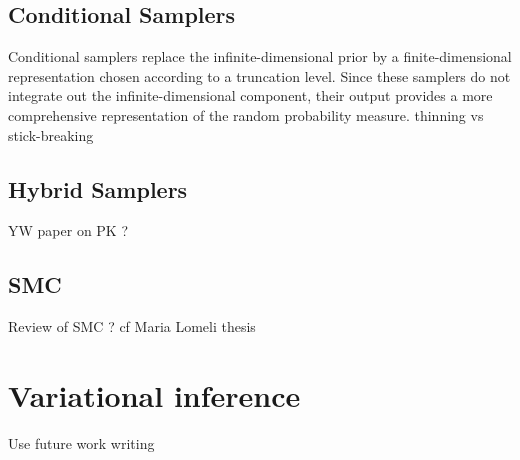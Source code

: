 \subsection{Conditional Samplers}
Conditional samplers replace the infinite-dimensional prior by a finite-dimensional representation chosen according to a truncation level. Since these samplers do not integrate out the infinite-dimensional component, their output provides a more comprehensive representation of the random probability measure.
thinning vs stick-breaking

\subsection{Hybrid Samplers}
YW paper on PK ?

\subsection{SMC}
Review of SMC ?
cf Maria Lomeli thesis


\section{Variational inference}
Use future work writing
